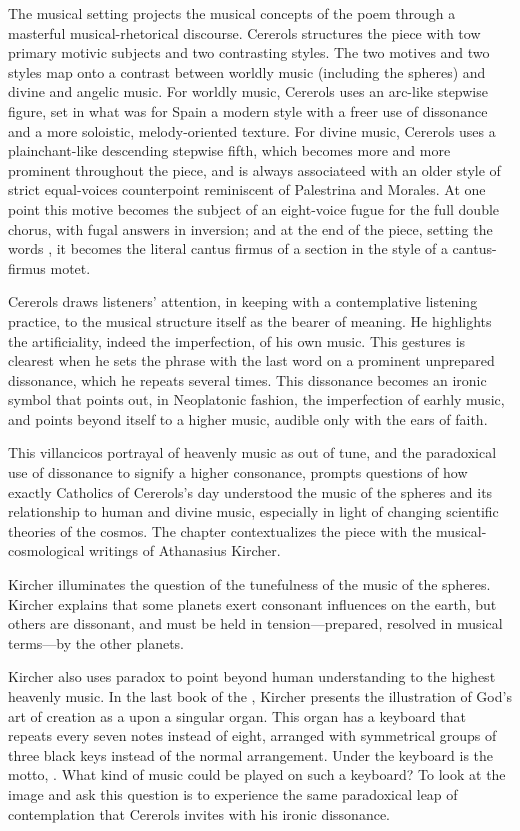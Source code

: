 \documentclass[tt]{vcbook-proposal}
\begin{document}
The musical setting projects the musical concepts of the poem through a masterful musical-rhetorical discourse.
Cererols structures the piece with tow primary motivic subjects and two contrasting styles.
The two motives and two styles map onto a contrast between worldly music (including the spheres) and divine and angelic music. 
For worldly music, Cererols uses an arc-like stepwise figure, set in what was for Spain a modern style with a freer use of dissonance and a more soloistic, melody-oriented texture.
For divine music, Cererols uses a plainchant-like descending stepwise fifth, which becomes more and more prominent throughout the piece, and is always associateed with an older style of strict equal-voices counterpoint reminiscent of Palestrina and Morales.
At one point this motive becomes the subject of an eight-voice fugue for the full double chorus, with fugal answers in inversion; and at the end of the piece, setting the words , it becomes the literal cantus firmus of a section in the style of a cantus-firmus motet.

Cererols draws listeners' attention, in keeping with a contemplative listening practice, to the musical structure itself as the bearer of meaning.
He highlights the artificiality, indeed the imperfection, of his own music.
This gestures is clearest when he sets the phrase  with the last word on a prominent unprepared dissonance, which he repeats several times.
This dissonance becomes an ironic symbol that points out, in Neoplatonic fashion, the imperfection of earhly music, and points beyond itself to a higher music, audible only with the ears of faith.

This villancicos portrayal of heavenly music as out of tune, and the paradoxical use of dissonance to signify a higher consonance, prompts questions of how exactly Catholics of Cererols's day understood the music of the spheres and its relationship to human and divine music, especially in light of changing scientific theories of the cosmos.
The chapter contextualizes the piece with the musical-cosmological writings of Athanasius Kircher.

Kircher illuminates the question of the tunefulness of the music of the spheres.
Kircher explains that some planets exert consonant influences on the earth, but others are dissonant, and must be held in tension---prepared, resolved in musical terms---by the other planets. 

Kircher also uses paradox to point beyond human understanding to the highest heavenly music. 
In the last book of the , Kircher presents the illustration of God's art of creation as a  upon a singular organ.
This organ has a keyboard that repeats every seven notes instead of eight, arranged with symmetrical groups of three black keys instead of the normal arrangement.
Under the keyboard is the motto, . 
What kind of music could be played on such a keyboard?
To look at the image and ask this question is to experience the same paradoxical leap of contemplation that Cererols invites with his ironic dissonance.
\end{document}
